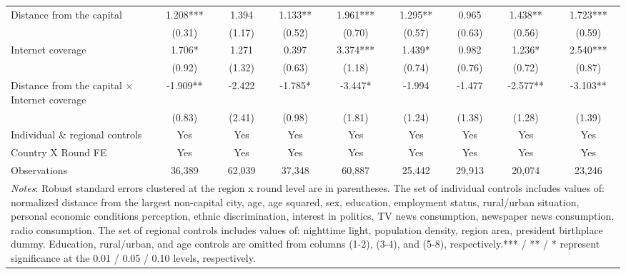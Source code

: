 \documentclass[11pt]{article}
\theoremstyle{plain}
\theoremstyle{plain}
\begin{document}
\begin{table}[H]
{\begin{tabular}{@{\extracolsep{5pt}} l c c c c c c c c}
                 Distance from the capital&       1.208***&       1.394   &       1.133** &       1.961***&       1.295** &       0.965   &       1.438** &       1.723*** \\
                 \smallskip
                 &      (0.31)   &      (1.17)   &      (0.52)   &      (0.70)   &      (0.57)   &      (0.63)   &      (0.56)   &      (0.59)   \\
                 Internet coverage  &       1.706*  &       1.271   &       0.397   &       3.374***&       1.439*  &       0.982   &       1.236*  &       2.540***\\
                 \smallskip
                 &      (0.92)   &      (1.32)   &      (0.63)   &      (1.18)   &      (0.74)   &      (0.76)   &      (0.72)   &      (0.87)   \\
                   Distance from the capital $\times$ Internet coverage&      -1.909** &      -2.422   &      -1.785*  &      -3.447*  &      -1.994   &      -1.477   &      -2.577** &      -3.103**  \\
                   \medskip
                   &      (0.83)   &      (2.41)   &      (0.98)   &      (1.81)   &      (1.24)   &      (1.38)   &      (1.28)   &      (1.39)   \\
                 \midrule
                 \smallskip
                Individual \& regional controls  & Yes & Yes & Yes & Yes& Yes & Yes & Yes & Yes\\
                \smallskip
                Country X Round FE       & Yes& Yes & Yes& Yes & Yes& Yes & Yes& Yes\\
                \smallskip
                Observations         &       36,389   &       62,039   &       37,348   &       60,887   &       25,442   &       29,913   &       20,074   &       23,246   \\
                \bottomrule
                \multicolumn{9}{p{24cm}}{\footnotesize \emph{Notes}: Robust standard errors clustered at the region x round level are in parentheses. The set of individual controls
                includes values of: normalized distance from the largest non-capital city, age, age squared, sex,
                education, employment status, rural/urban situation, personal economic conditions perception, ethnic discrimination, interest in politics, TV news consumption, newspaper news consumption, radio consumption. The set of regional controls includes values of: nighttime light, population density, region area, president birthplace dummy. Education, rural/urban, and age controls are omitted from columns (1-2), (3-4), and (5-8), respectively.*** / ** / * represent significance at the 0.01 / 0.05 / 0.10 levels, respectively.}
                \end{tabular}
                }
                \end{table}
\end{document}
